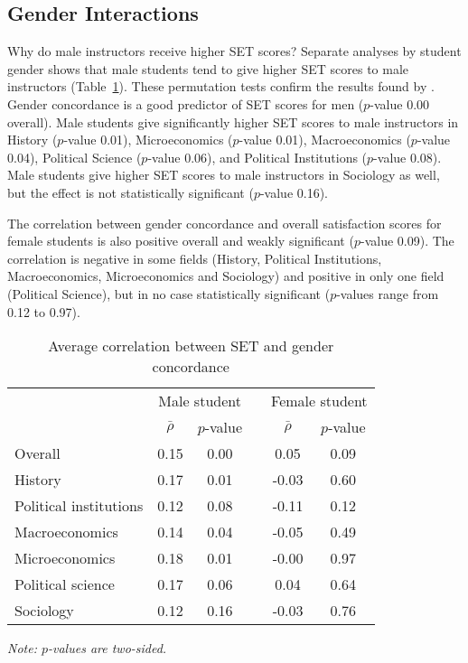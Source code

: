 \documentclass[12pt]{article}
\begin{document}
\subsection{Gender Interactions}
Why do male instructors receive higher SET scores? 
Separate analyses by student gender shows that
male students tend to give higher SET scores to male instructors 
(Table~\ref{tab:genderconcordance}). 
These permutation tests confirm the results found by \citet{Boring2015}. 
Gender concordance is a good predictor of SET scores for men ($p$-value 0.00 overall). 
Male students give significantly higher SET scores to male instructors in  
History ($p$-value 0.01), Microeconomics ($p$-value 0.01), 
Macroeconomics ($p$-value 0.04), Political Science ($p$-value 0.06), and 
Political Institutions ($p$-value 0.08). 
Male students give higher SET scores to male instructors in Sociology as well, but the
effect is not statistically significant ($p$-value 0.16). 

The correlation between gender concordance and overall satisfaction scores 
for female students is also positive overall and weakly significant ($p$-value 0.09). 
The correlation is negative in some fields (History, Political Institutions, 
Macroeconomics, Microeconomics and Sociology) and positive in only one field 
(Political Science), but in no case statistically significant 
($p$-values range from 0.12 to 0.97).

\begin{table}[htbp]
  \centering
  \footnotesize 
  \caption{Average correlation between SET and gender concordance}
    \begin{tabular}{lccccc}
    \toprule 
          & \multicolumn{2}{c}{Male student}  &  & \multicolumn{2}{c}{Female student} \\
      & $\bar{\rho}$  &  $p$-value &  & $\bar{\rho}$  &  $p$-value    \\
   \midrule
      \quad  Overall                &  0.15       & 0.00 & &  0.05       & 0.09     \\
      \quad  History                &  0.17       & 0.01 & & -0.03       & 0.60     \\
      \quad  Political institutions &  0.12       & 0.08 & & -0.11       & 0.12     \\
      \quad  Macroeconomics    &  0.14      & 0.04 & & -0.05       & 0.49     \\
      \quad  Microeconomics     &  0.18       & 0.01 & &  -0.00      & 0.97     \\
      \quad  Political science     &  0.17       & 0.06 & &  0.04       & 0.64     \\
      \quad  Sociology              &  0.12       & 0.16 & & -0.03       & 0.76     \\
    \bottomrule
    \end{tabular}%
 \label{tab:genderconcordance}%
  
  \textit{Note: $p$-values are two-sided.}
\end{table}%
\normalsize
\end{document}
